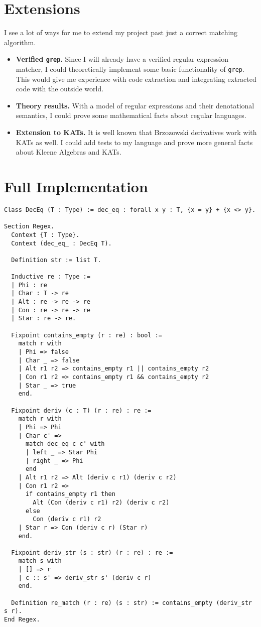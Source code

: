 \documentclass{article}
\begin{document}
\section{Extensions}
I see a lot of ways for me to extend my project past just a correct matching
algorithm.
\begin{itemize}
  \item {\bf Verified \verb|grep|.} Since I will already have a verified regular
    expression matcher, I could theoretically implement some basic functionality
    of \verb|grep|. This would give me experience with code extraction and
    integrating extracted code with the outside world.
  \item {\bf Theory results.} With a model of regular expressions and their
    denotational semantics, I could prove some mathematical facts about regular
    languages.
  \item {\bf Extension to KATs.} It is well known that Brzozowski derivatives
    work with KATs as well. I could add tests to my language and prove more
    general facts about Kleene Algebras and KATs.
\end{itemize}

\pagebreak
\appendix
\section{Full Implementation}
\begin{verbatim}
Class DecEq (T : Type) := dec_eq : forall x y : T, {x = y} + {x <> y}.

Section Regex.
  Context {T : Type}.
  Context (dec_eq_ : DecEq T).

  Definition str := list T.

  Inductive re : Type :=
  | Phi : re
  | Char : T -> re
  | Alt : re -> re -> re
  | Con : re -> re -> re
  | Star : re -> re.

  Fixpoint contains_empty (r : re) : bool :=
    match r with
    | Phi => false
    | Char _ => false
    | Alt r1 r2 => contains_empty r1 || contains_empty r2
    | Con r1 r2 => contains_empty r1 && contains_empty r2
    | Star _ => true
    end.

  Fixpoint deriv (c : T) (r : re) : re :=
    match r with
    | Phi => Phi
    | Char c' =>
      match dec_eq c c' with
      | left _ => Star Phi
      | right _ => Phi
      end
    | Alt r1 r2 => Alt (deriv c r1) (deriv c r2)
    | Con r1 r2 =>
      if contains_empty r1 then
        Alt (Con (deriv c r1) r2) (deriv c r2)
      else
        Con (deriv c r1) r2
    | Star r => Con (deriv c r) (Star r)
    end.

  Fixpoint deriv_str (s : str) (r : re) : re :=
    match s with
    | [] => r
    | c :: s' => deriv_str s' (deriv c r)
    end.

  Definition re_match (r : re) (s : str) := contains_empty (deriv_str s r).
End Regex.
\end{verbatim}
\end{document}
